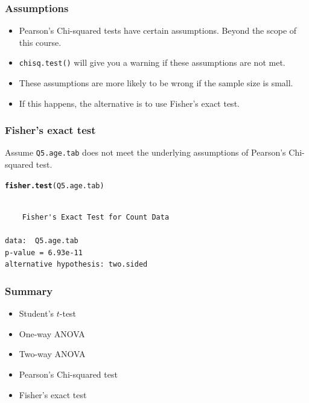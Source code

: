 \documentclass{beamer}\usepackage[]{graphicx}\usepackage[]{color}
\makeatletter
\newcommand{\hlstd}[1]{\textcolor[rgb]{0.345,0.345,0.345}{#1}}%
\newcommand{\hlkwd}[1]{\textcolor[rgb]{0.737,0.353,0.396}{\textbf{#1}}}%
\newenvironment{kframe}{%
 \def\at@end@of@kframe{}%
 \ifinner\ifhmode%
  \def\at@end@of@kframe{\end{minipage}}%
  \begin{minipage}{\columnwidth}%
 \fi\fi%
 \def\FrameCommand##1{\hskip\@totalleftmargin \hskip-\fboxsep
 \colorbox{shadecolor}{##1}\hskip-\fboxsep
     \hskip-\linewidth \hskip-\@totalleftmargin \hskip\columnwidth}%
 \MakeFramed {\advance\hsize-\width
   \@totalleftmargin\z@ \linewidth\hsize
   \@setminipage}}%
 {\par\unskip\endMakeFramed%
 \at@end@of@kframe}
\newenvironment{knitrout}{}{} %
\makeatother
\begin{document}
\begin{frame}[fragile]
  \frametitle{Assumptions}
\begin{itemize}
\item Pearson's Chi-squared tests have certain assumptions. Beyond the scope of this course.
\item \texttt{chisq.test()} will give you a warning if these assumptions are not met.
\begin{knitrout}
\color{fgcolor}\begin{kframe}


{\ttfamily\noindent\color{warningcolor}{Warning in chisq.test(mytest): Chi-squared approximation may be incorrect}}\end{kframe}
\end{knitrout}
\item These assumptions are more likely to be wrong if the sample size is small.
\item If this happens, the alternative is to use Fisher's exact test.
\end{itemize}
\end{frame} 

\begin{frame}[fragile]
  \frametitle{Fisher's exact test}
Assume \texttt{Q5.age.tab} does not meet the underlying assumptions of Pearson's Chi-squared test.
\begin{knitrout}
\color{fgcolor}\begin{kframe}
\begin{alltt}
\hlkwd{fisher.test}\hlstd{(Q5.age.tab)}
\end{alltt}
\begin{verbatim}

	Fisher's Exact Test for Count Data

data:  Q5.age.tab
p-value = 6.93e-11
alternative hypothesis: two.sided
\end{verbatim}
\end{kframe}
\end{knitrout}
\end{frame} 

\begin{frame}[fragile]
  \frametitle{Summary}
  \begin{itemize}
  \item Student's $t$-test
  \item One-way ANOVA
  \item Two-way ANOVA
  \item Pearson’s Chi-squared test
  \item Fisher’s exact test
  \end{itemize}
\end{frame}
\end{document}
